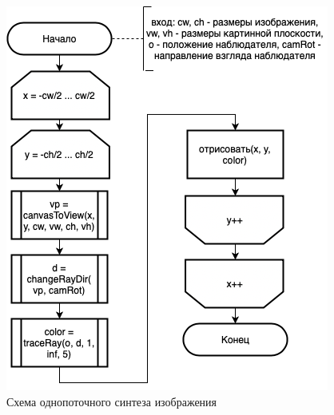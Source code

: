 \documentclass[12pt]{report}
\begin{document}
\begin{figure}[h!p]
	\centering
	\includegraphics[scale = 0.7]{one.drawio.png}
	\caption{Схема однопоточного синтеза изображения}
	\label{fig:one}
\end{figure}
\end{document}
